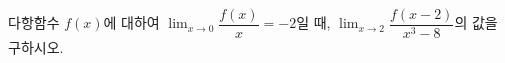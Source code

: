다항함수 $f(x)$에 대하여 $\displaystyle\lim_{x\to 0}\dfrac{f(x)}{x}=-2$일 때, $\displaystyle\lim_{x\to 2}\dfrac{f(x-2)}{x^3-8}$의 값을 구하시오.
